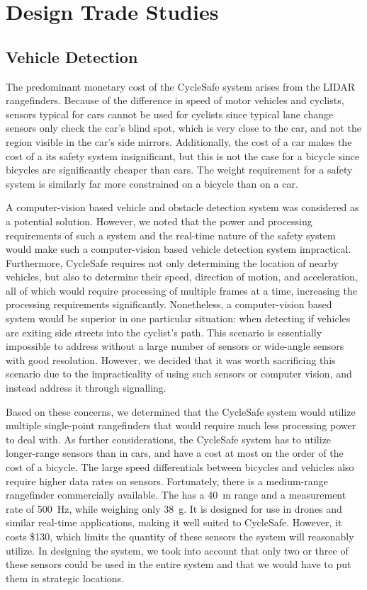 \documentclass[journal]{IEEEtran}
\begin{document}
\section{Design Trade Studies}

\subsection{Vehicle Detection}
The predominant monetary cost of the CycleSafe system arises from the LIDAR rangefinders. Because of the difference in speed of motor vehicles and cyclists, sensors typical for cars cannot be used for cyclists since typical lane change sensors only check the car's blind spot, which is very close to the car, and not the region visible in the car's side mirrors. Additionally, the cost of a car makes the cost of a its safety system insignificant, but this is not the case for a bicycle since bicycles are significantly cheaper than cars. The weight requirement for a safety system is similarly far more constrained on a bicycle than on a car.

A computer-vision based vehicle and obstacle detection system was considered as a potential solution. However, we noted that the power and processing requirements of such a system and the real-time nature of the safety system would make such a computer-vision based vehicle detection system impractical. Furthermore, CycleSafe requires not only determining the location of nearby vehicles, but also to determine their speed, direction of motion, and acceleration, all of which would require processing of multiple frames at a time, increasing the processing requirements significantly. Nonetheless, a computer-vision based system would be superior in one particular situation: when detecting if vehicles are exiting side streets into the cyclist's path. This scenario is essentially impossible to address without a large number of sensors or wide-angle sensors with good resolution. However, we decided that it was worth sacrificing this scenario due to the impracticality of using such sensors or computer vision, and instead address it through signalling.

Based on these concerns, we determined that the CycleSafe system would utilize multiple single-point rangefinders that would require much less processing power to deal with. As further considerations, the CycleSafe system has to utilize longer-range sensors than in cars, and have a cost at most on the order of the cost of a bicycle. The large speed differentials between bicycles and vehicles also require higher data rates on sensors. Fortunately, there is a medium-range rangefinder commercially available. The \lidar{} has a \SI{40}{\meter} range and a measurement rate of \SI{500}{\Hz}, while weighing only \SI{38}{\gram}. It is designed for use in drones and similar real-time applications, making it well suited to CycleSafe. However, it costs \$130, which limits the quantity of these sensors the system will reasonably utilize. In designing the system, we took into account that only two or three of these sensors could be used in the entire system and that we would have to put them in strategic locations.
\end{document}
